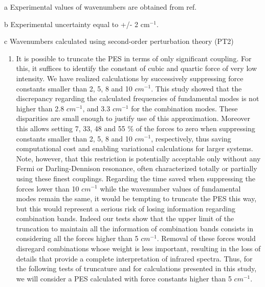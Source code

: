 \begin{table}[htb]
\begin{center}
\begin{threeparttable}[b]
  		\begin{tablenotes}
  		\item[a] Experimental values of wavenumbers are obtained from ref\cite{michaelian2012far}.
  		\item[b] Experimental uncertainty equal to +/- 2 cm$^{-1}$.\\
  		\item[c] Wavenumbers calculated using second-order perturbation theory (PT2)
  	\end{tablenotes}
  \end{threeparttable}
  	\end{center}
  	\label{table2}
  \end{table}

\begin{enumerate}
	\item It is possible to truncate the PES in terms of only significant coupling. For this, it suffices to identify the constant of cubic and quartic force of very low intensity. We have realized calculations by successively suppressing force constants smaller than 2, 5, 8 and 10 $cm^{-1}$.  This study showed that the discrepancy regarding the calculated frequencies of fundamental modes is not higher than 2.8 $cm^{-1}$, and 3.3 $cm^{-1}$ for the combination modes. These disparities are small enough to justify use of this approximation. Moreover this allows setting 7, 33, 48 and 55 \% of the forces to zero when suppressing constants smaller than 2, 5, 8 and 10 $cm^{-1}$, respectively, thus saving computational cost and enabling variational calculations for larger systems. Note, however, that this restriction is potentially acceptable only without any Fermi or Darling-Dennison resonance, often characterized totally or partially using these finest couplings. Regarding the time saved when suppressing the forces lower than 10 $cm^{-1}$ while the wavenumber values of fundamental modes remain the same, it would be tempting to truncate the PES this way, but this would represent a serious risk of losing information regarding combination bands. Indeed our tests show that the upper limit of the truncation to maintain all the information of combination bands consists in considering all the forces higher than 5 $cm^{-1}$. Removal of these forces would disregard combinations whose weight is less important, resulting in the loss of details that provide a complete interpretation of infrared spectra. Thus, for the following tests of truncature and for calculations presented in this study, we will consider a PES calculated with force constants higher than 5 $cm^{-1}$.
	

\end{enumerate}
